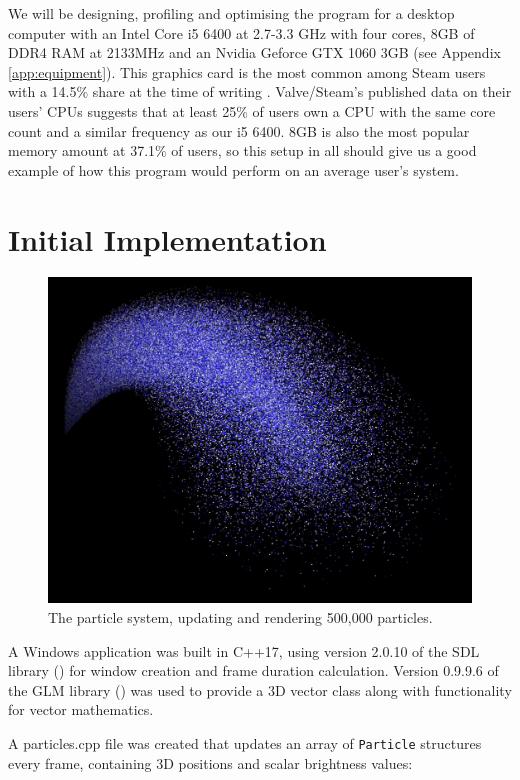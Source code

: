 \documentclass[11pt, a4paper, twocolumn]{article}
\begin{document}
We will be designing, profiling and optimising the program for a desktop computer with an Intel Core i5 6400 at 2.7-3.3 GHz with four cores, 8GB of DDR4 RAM at 2133MHz and an Nvidia Geforce GTX 1060 3GB (see Appendix \ref{app:equipment}). This  graphics card is the most common among Steam users with a 14.5\% share at the time of writing \citep{SteamSurvey}. Valve/Steam's published data on their users' CPUs suggests that at least 25\% of users own a CPU with the same core count and a similar frequency as our i5 6400. 8GB is also the most popular memory amount at 37.1\% of users, so this setup in all should give us a good example of how this program would perform on an average user's system.

\section{Initial Implementation}

\begin{figure}[h]
\includegraphics[width=\linewidth]{particles}
\caption{The particle system, updating and rendering 500,000 particles.}
\label{fig:particles}
\end{figure}

A Windows application was built in C++17, using version 2.0.10 of the SDL library (\citeyear{SDL2}) for window creation and frame duration calculation. Version 0.9.9.6 of the GLM library (\citeyear{GLM}) was used to provide a 3D vector class along with functionality for vector mathematics.

A particles.cpp file was created that updates an array of \verb|Particle| structures every frame, containing 3D positions and scalar brightness values:
\end{document}

